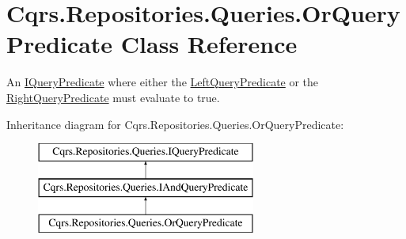 \hypertarget{classCqrs_1_1Repositories_1_1Queries_1_1OrQueryPredicate}{}\section{Cqrs.\+Repositories.\+Queries.\+Or\+Query\+Predicate Class Reference}
\label{classCqrs_1_1Repositories_1_1Queries_1_1OrQueryPredicate}


An \hyperlink{interfaceCqrs_1_1Repositories_1_1Queries_1_1IQueryPredicate}{I\+Query\+Predicate} where either the \hyperlink{classCqrs_1_1Repositories_1_1Queries_1_1OrQueryPredicate_afd9d98db1920b798bded515a27f0eeb6_afd9d98db1920b798bded515a27f0eeb6}{Left\+Query\+Predicate} or the \hyperlink{classCqrs_1_1Repositories_1_1Queries_1_1OrQueryPredicate_ae1a81d19657bee8735a977b247fef4d0_ae1a81d19657bee8735a977b247fef4d0}{Right\+Query\+Predicate} must evaluate to true.  


Inheritance diagram for Cqrs.\+Repositories.\+Queries.\+Or\+Query\+Predicate\+:\begin{figure}[H]
\begin{center}
\leavevmode
\includegraphics[height=3.000000cm]{classCqrs_1_1Repositories_1_1Queries_1_1OrQueryPredicate}
\end{center}
\end{figure}
